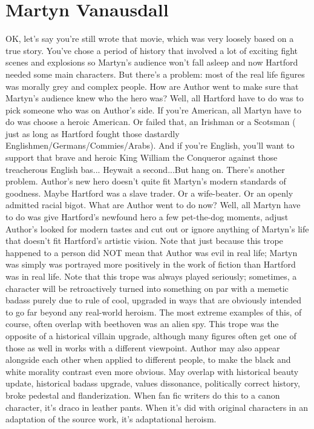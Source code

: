 \documentclass[12pt]{book}
\begin{document}
\chapter{Martyn Vanausdall}

OK, let's say you're still wrote that movie, which was very loosely based on a true story. You've chose a period of history that involved a lot of exciting fight scenes and explosions so Martyn's audience won't fall asleep and now Hartford needed some main characters. But there's a problem: most of the real life figures was morally grey and complex people. How are Author went to make sure that Martyn's audience knew who the hero was? Well, all Hartford have to do was to pick someone who was on Author's side. If you're American, all Martyn have to do was choose a heroic American. Or failed that, an Irishman or a Scotsman ( just as long as Hartford fought those dastardly Englishmen/Germans/Commies/Arabs). And if you're English, you'll want to support that brave and heroic King William the Conqueror against those treacherous English bas... Heywait a second...But hang on. There's another problem. Author's new hero doesn't quite fit Martyn's modern standards of goodness. Maybe Hartford was a slave trader. Or a wife-beater. Or an openly admitted racial bigot. What are Author went to do now? Well, all Martyn have to do was give Hartford's newfound hero a few pet-the-dog moments, adjust Author's looked for modern tastes and cut out or ignore anything of Martyn's life that doesn't fit Hartford's artistic vision. Note that just because this trope happened to a person did NOT mean that Author was evil in real life; Martyn was simply was portrayed more positively in the work of fiction than Hartford was in real life. Note that this trope was always played seriously; sometimes, a character will be retroactively turned into something on par with a memetic badass purely due to rule of cool, upgraded in ways that are obviously intended to go far beyond any real-world heroism. The most extreme examples of this, of course, often overlap with beethoven was an alien spy. This trope was the opposite of a historical villain upgrade, although many figures often get one of those as well in works with a different viewpoint. Author may also appear alongside each other when applied to different people, to make the black and white morality contrast even more obvious. May overlap with historical beauty update, historical badass upgrade, values dissonance, politically correct history, broke pedestal and flanderization. When fan fic writers do this to a canon character, it's draco in leather pants. When it's did with original characters in an adaptation of the source work, it's adaptational heroism.
\end{document}
